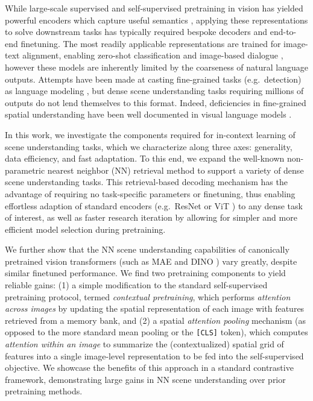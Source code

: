 \documentclass{article}
\begin{document}
While large-scale supervised and self-supervised pretraining in vision has yielded powerful encoders which capture useful semantics \cite{krizhevsky2012imagenet, he2016deep, henaff2019data, he2019momentum, caron2021emerging, kolesnikov2020big, dosovitskiy2020image}, applying these representations to solve downstream tasks has typically required bespoke decoders and end-to-end finetuning. The most readily applicable representations are trained for image-text alignment, enabling zero-shot classification \cite{radford2021learning} and image-based dialogue \cite{alayrac2022flamingo, chen2022pali, yuan2021florence,yu2022coca}, however these models are inherently limited by the coarseness of natural language outputs. Attempts have been made at casting fine-grained tasks (e.g.\ detection) as language modeling \cite{chen2021pix2seq}, but dense scene understanding tasks requiring millions of outputs do not lend themselves to this format. Indeed, deficiencies in fine-grained spatial understanding have been well documented in visual
language models \cite{liu2022visual,thrush2022winoground,xie2019visual,hendricks2021probing}. 

In this work, we investigate the components required for in-context learning of scene understanding tasks, which we characterize along three axes: generality, data efficiency, and fast adaptation. To this end, we expand the well-known non-parametric nearest neighbor (NN) retrieval method \cite{belongie2002shape, boiman2008defense, wu2018unsupervised, caron2021emerging} to support a variety of dense scene understanding tasks. This retrieval-based decoding mechanism has the advantage of requiring no task-specific parameters or finetuning, thus enabling effortless adaption of standard encoders (e.g.\ ResNet  \cite{he2016deep} or ViT \cite{dosovitskiy2020image}) to any dense task of interest, as well as faster research iteration by allowing for simpler and more efficient model selection during pretraining. 

We further show that the NN scene understanding capabilities of canonically pretrained vision transformers (such as MAE \cite{he2021masked} and DINO \cite{caron2021emerging}) vary greatly, despite similar finetuned performance. We find two pretraining components to yield reliable gains: 
(1) a simple modification to the standard self-supervised pretraining protocol, termed \textit{contextual pretraining}, which performs \textit{attention across images} by updating the spatial representation of each image with features retrieved from a memory bank, and (2) a spatial \textit{attention pooling} mechanism (as opposed to the more standard mean pooling or the \texttt{[CLS]} token), which computes \textit{attention within an image} to summarize the (contextualized) spatial grid of features into a single image-level representation to be fed into the self-supervised objective. We showcase the benefits of this approach in a standard contrastive framework, demonstrating large gains in NN scene understanding over prior pretraining methods. 
\end{document}
